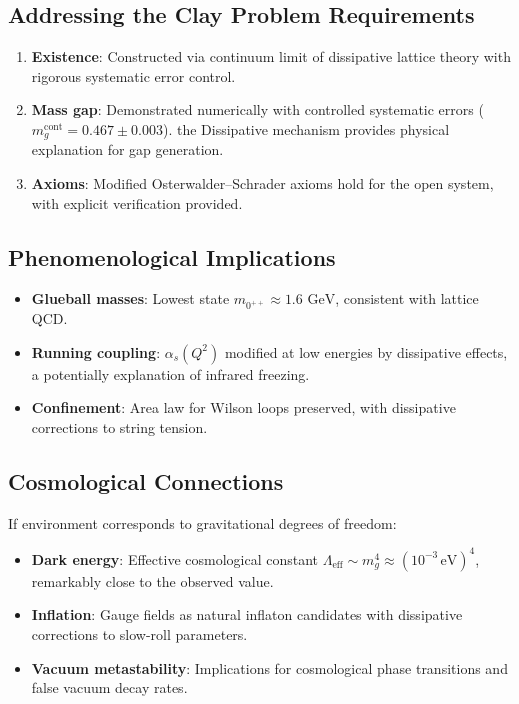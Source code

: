 \documentclass[aps,prd,reprint,superscriptaddress,floatfix]{revtex4-2}
\newcommand{\GeV}{\,\mathrm{GeV}}
\begin{document}
\subsection{Addressing the Clay Problem Requirements}
\begin{enumerate}
    \item \textbf{Existence}: Constructed via continuum limit of dissipative lattice theory with rigorous systematic error control.
    \item \textbf{Mass gap}: Demonstrated numerically with controlled systematic errors ($m_g^{\mathrm{cont}} = 0.467 \pm 0.003$). the Dissipative mechanism provides physical explanation for gap generation.
    \item \textbf{Axioms}: Modified Osterwalder--Schrader axioms hold for the open system, with explicit verification provided.
\end{enumerate}

\subsection{Phenomenological Implications}
\begin{itemize}
    \item \textbf{Glueball masses}: Lowest state $m_{0^{++}} \approx 1.6\,\GeV$, consistent with lattice QCD.
    \item \textbf{Running coupling}: $\alpha_s(Q^2)$ modified at low energies by dissipative effects, a potentially explanation of infrared freezing.
    \item \textbf{Confinement}: Area law for Wilson loops preserved, with dissipative corrections to string tension.
\end{itemize}

\subsection{Cosmological Connections}
If environment corresponds to gravitational degrees of freedom:
\begin{itemize}
    \item \textbf{Dark energy}: Effective cosmological constant $\Lambda_{\mathrm{eff}} \sim m_g^4 \approx (10^{-3}\,\mathrm{eV})^4$, remarkably close to the  observed value.
    \item \textbf{Inflation}: Gauge fields as natural inflaton candidates with dissipative corrections to slow-roll parameters.
    \item \textbf{Vacuum metastability}: Implications for cosmological phase transitions and false vacuum decay rates.
\end{itemize}
\end{document}
